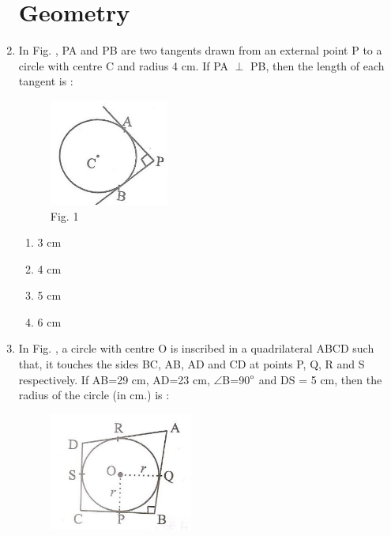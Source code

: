 \documentclass[10pt,-letter paper]{article}
\begin{document}
\begin{enumerate}
 \section{Geometry}
\item In Fig. , PA and PB are two tangents drawn from an external point P to a
circle with centre C and radius 4 cm. If PA $\perp$ PB, then the length of each
tangent is :
		\begin{figure}
			\centering
			\includegraphics[width=0.5\columnwidth]{1.png}
\caption{Fig. 1}
    \label{fig1}
		\end{figure}
 \begin{enumerate}
    \item 3 cm\\
    \item 4 cm\\
    \item 5 cm\\
    \item 6 cm
 \end{enumerate}
\item In Fig. , a circle with centre O is inscribed in a quadrilateral ABCD such
that, it touches the sides BC, AB, AD and CD at points P, Q, R and S respectively. If AB=29 cm, AD=23 cm, $\angle$B=90$\degree$ and DS = 5 cm, then the radius of the circle (in cm.) is : \\
		\begin{figure}
			\centering
\includegraphics[width=0.5\columnwidth]{2.png}

\end{figure}
\end{enumerate}
\end{document}
